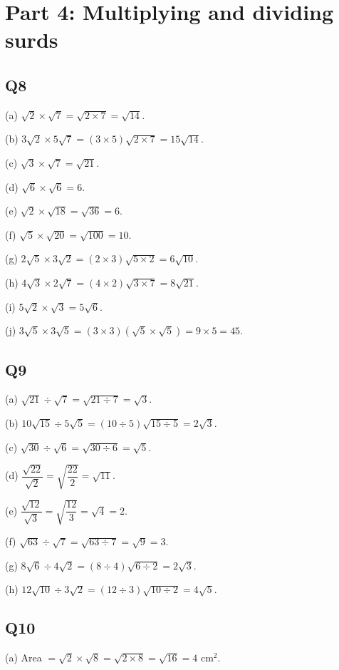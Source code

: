 \documentclass[12pt,a4paper]{article}
\begin{document}
\section*{Part 4: Multiplying and dividing surds}

\subsection*{Q8}
(a) $\sqrt2\times\sqrt7 = \sqrt{2\times7} = \sqrt{14}$.

(b) $3\sqrt2\times5\sqrt7 = (3\times5)\sqrt{2\times7} = 15\sqrt{14}$.

(c) $\sqrt3\times\sqrt7 = \sqrt{21}$.

(d) $\sqrt6\times\sqrt6 = 6$.

(e) $\sqrt2\times\sqrt{18} = \sqrt{36} = 6$.

(f) $\sqrt5\times\sqrt{20} = \sqrt{100} = 10$.

(g) $2\sqrt5\times3\sqrt2 = (2\times3)\sqrt{5\times2} = 6\sqrt{10}$.

(h) $4\sqrt3\times2\sqrt7 = (4\times2)\sqrt{3\times7} = 8\sqrt{21}$.

(i) $5\sqrt2\times\sqrt3 = 5\sqrt{6}$.

(j) $3\sqrt5\times3\sqrt5 = (3\times3)(\sqrt5\times\sqrt5) = 9\times5 = 45$.

\subsection*{Q9}
(a) $\sqrt{21}\div\sqrt7 = \sqrt{21\div7} = \sqrt3$.

(b) $10\sqrt{15}\div5\sqrt5 = (10\div5)\sqrt{15\div5} = 2\sqrt3$.

(c) $\sqrt{30}\div\sqrt6 = \sqrt{30\div6} = \sqrt5$.

(d) $\dfrac{\sqrt{22}}{\sqrt2} = \sqrt{\dfrac{22}{2}} = \sqrt{11}$.

(e) $\dfrac{\sqrt{12}}{\sqrt3} = \sqrt{\dfrac{12}{3}} = \sqrt4 = 2$.

(f) $\sqrt{63}\div\sqrt7 = \sqrt{63\div7} = \sqrt9 = 3$.

(g) $8\sqrt6\div4\sqrt2 = (8\div4)\sqrt{6\div2} = 2\sqrt3$.

(h) $12\sqrt{10}\div3\sqrt2 = (12\div3)\sqrt{10\div2} = 4\sqrt5$.

\subsection*{Q10}
(a) Area $= \sqrt2\times\sqrt8 = \sqrt{2\times8} = \sqrt{16} = 4$ cm$^2$.
\end{document}
